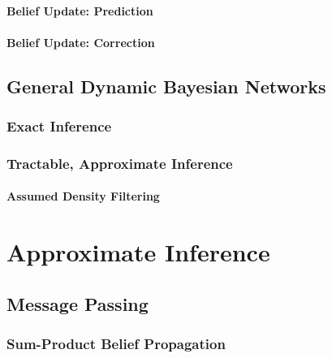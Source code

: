             \subsubsection{Belief Update: Prediction} %

            \subsubsection{Belief Update: Correction} %

    \section{General Dynamic Bayesian Networks} %

        \subsection{Exact Inference} %

        \subsection{Tractable, Approximate Inference} %

            \subsubsection{Assumed Density Filtering} %

\chapter{Approximate Inference} %

    \section{Message Passing} %

        \subsection{Sum-Product Belief Propagation} %

